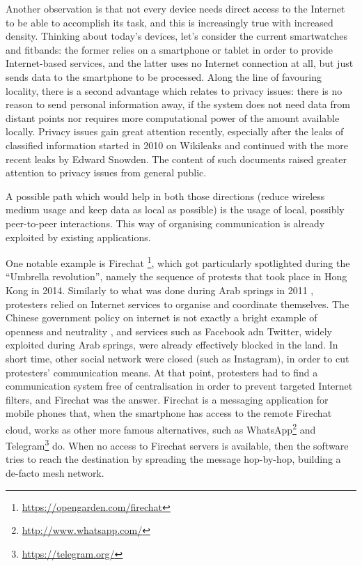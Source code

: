 \documentclass[12pt,a4paper,twoside,openright]{book}
\begin{document}
Another observation is that not every device needs direct access to the Internet to be able to accomplish its task, and this is increasingly true with increased density.
%
Thinking about today's devices, let's consider the current smartwatches and fitbands: the former relies on a smartphone or tablet in order to provide Internet-based services, and the latter uses no Internet connection at all, but just sends data to the smartphone to be processed.
%
Along the line of favouring locality, there is a second advantage which relates to privacy issues: there is no reason to send personal information away, if the system does not need data from distant points nor requires more computational power of the amount available locally.
%
Privacy issues gain great attention recently, especially after the leaks of classified information started in 2010 on Wikileaks and continued with the more recent leaks by Edward Snowden.
%
The content of such documents raised greater attention to privacy issues from general public.

A possible path which would help in both those directions (reduce wireless medium usage and keep data as local as possible) is the usage of local, possibly peer-to-peer interactions.
%
This way of organising communication is already exploited by existing applications.

One notable example is Firechat \footnote{\url{https://opengarden.com/firechat}}, which got particularly spotlighted during the ``Umbrella revolution'', namely the sequence of protests that took place in Hong Kong in 2014.
%
Similarly to what was done during Arab springs in 2011 \cite{arab-spring}, protesters relied on Internet services to organise and coordinate themselves.
%
The Chinese government policy on internet is not exactly a bright example of openness and neutrality \cite{china-censorship}, and services such as Facebook adn Twitter, widely exploited during Arab springs, were already effectively blocked in the land.
%
In short time, other social network were closed (such as Instagram), in order to cut protesters' communication means.
%
At that point, protesters had to find a communication system free of centralisation in order to prevent targeted Internet filters, and Firechat was the answer.
%
Firechat is a messaging application for mobile phones that, when the smartphone has access to the remote Firechat cloud, works as other more famous alternatives, such as WhatsApp\footnote{\url{http://www.whatsapp.com/}} and Telegram\footnote{\url{https://telegram.org/}} do.
%
When no access to Firechat servers is available, then the software tries to reach the destination by spreading the message hop-by-hop, building a de-facto mesh network.
\end{document}
